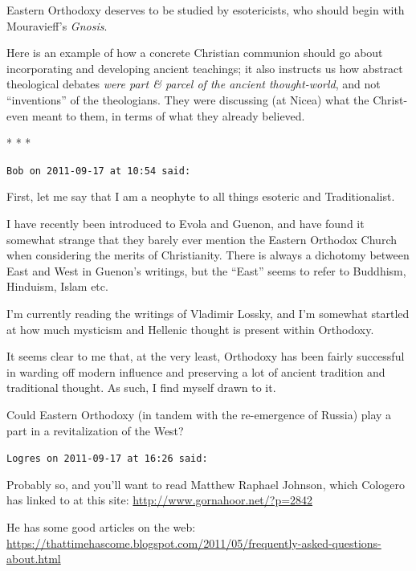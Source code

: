 Eastern Orthodoxy deserves to be studied by esotericists, who should begin with Mouravieff's \emph{Gnosis}.

Here is an example of how a concrete Christian communion should go about incorporating and developing ancient teachings; it also instructs us how abstract theological debates \emph{were part \& parcel of the ancient thought-world}, and not ``inventions'' of the theologians. They were discussing (at Nicea) what the Christ-even meant to them, in terms of what they already believed.



\begin{center}* * *\end{center}

\begin{footnotesize}
\begin{sffamily}
\texttt{Bob on 2011-09-17 at 10:54 said:}

First, let me say that I am a neophyte to all things esoteric and Traditionalist.

I have recently been introduced to Evola and Guenon, and have found it somewhat strange that they barely ever mention the Eastern Orthodox Church when considering the merits of Christianity. There is always a dichotomy between East and West in Guenon's writings, but the ``East'' seems to refer to Buddhism, Hinduism, Islam etc.

I'm currently reading the writings of Vladimir Lossky, and I'm somewhat startled at how much mysticism and Hellenic thought is present within Orthodoxy.

It seems clear to me that, at the very least, Orthodoxy has been fairly successful in warding off modern influence and preserving a lot of ancient tradition and traditional thought. As such, I find myself drawn to it.

Could Eastern Orthodoxy (in tandem with the re-emergence of Russia) play a part in a revitalization of the West?

\hfill

\texttt{Logres on 2011-09-17 at 16:26 said:}

Probably so, and you'll want to read Matthew Raphael Johnson, which Cologero has linked to at this site: \url{http://www.gornahoor.net/?p=2842}

He has some good articles on the web: 
\url{https://thattimehascome.blogspot.com/2011/05/frequently-asked-questions-about.html}



\end{sffamily}
\end{footnotesize}

